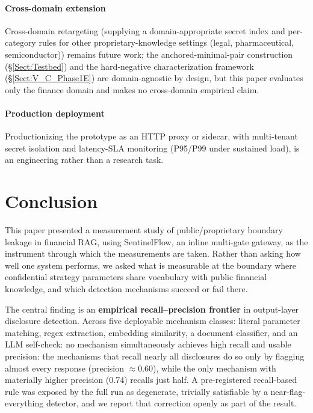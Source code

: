\documentclass[journal]{IEEEtran}
\begin{document}
\paragraph{Cross-domain extension}
Cross-domain retargeting (supplying a domain-appropriate secret index and per-category rules for other proprietary-knowledge settings (legal, pharmaceutical, semiconductor)) remains future work; the anchored-minimal-pair construction (\S\ref{Sect:Testbed}) and the hard-negative characterization framework (\S\ref{Sect:V_C_Phase1E}) are domain-agnostic by design, but this paper evaluates only the finance domain and makes no cross-domain empirical claim.

\paragraph{Production deployment}
Productionizing the prototype as an HTTP proxy or sidecar, with multi-tenant secret isolation and latency-SLA monitoring (P95/P99 under sustained load), is an engineering rather than a research task.

\section{Conclusion}
\label{Sect:Conclusion}



This paper presented a measurement study of public/proprietary boundary leakage
in financial RAG, using SentinelFlow, an inline multi-gate gateway, as the
instrument through which the measurements are taken. Rather than asking how well
one system performs, we asked what is measurable at the boundary where
confidential strategy parameters share vocabulary with public financial
knowledge, and which detection mechanisms succeed or fail there.

The central finding is an \textbf{empirical recall--precision frontier} in
output-layer disclosure detection. Across five deployable mechanism
classes: literal parameter matching, regex extraction, embedding similarity, a
document classifier, and an LLM self-check: no mechanism simultaneously achieves
high recall and usable precision: the mechanisms that recall nearly all
disclosures do so only by flagging almost every response (precision $\approx
0.60$), while the only mechanism with materially higher precision (0.74) recalls
just half. A pre-registered recall-based rule was exposed by the full run as
degenerate, trivially satisfiable by a near-flag-everything detector, and we
report that correction openly as part of the result.
\end{document}
